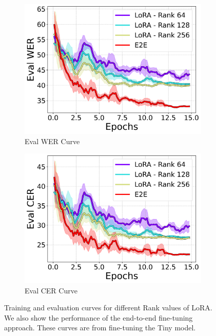 \documentclass[10pt,twocolumn,letterpaper]{article}
\begin{document}
\begin{figure}[t]
\begin{subfigure}[b]{0.24\textwidth}
        \includegraphics[width=\textwidth]{./lora_comparison/eval_wer_line.png}
        \caption{Eval WER Curve}
    \end{subfigure}
    \begin{subfigure}[b]{0.24\textwidth}
        \centering
        \includegraphics[width=\textwidth]{./lora_comparison/eval_cer_line.png}
        \caption{Eval CER Curve}
    \end{subfigure}
    \caption{Training and evaluation curves for different Rank values of LoRA. We also show the performance of the end-to-end fine-tuning approach. These curves are from fine-tuning the Tiny model.}
    \label{fig:lora_comparison}
\end{figure}
\end{document}
